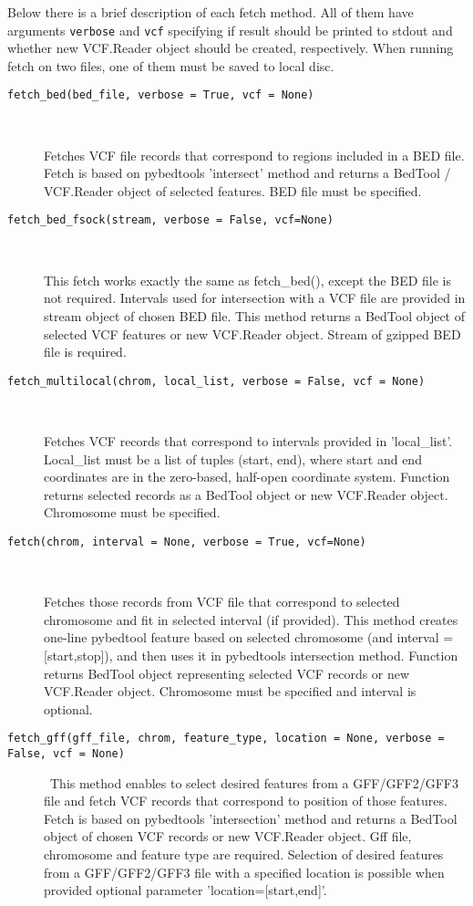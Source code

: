 \noindent Below there is a brief description of each fetch method.
All of them have arguments \verb|verbose| and \verb|vcf| specifying if result should be printed to stdout
and whether new VCF.Reader object should be created, respectively. When running fetch on two files, one of them must be
saved to local disc.

\begin{description}
  \item[\texttt{fetch\_bed(bed\_file, verbose = True, vcf = None)}] \

    Fetches VCF file records that correspond to regions included in a BED file.
    Fetch is based on pybedtools 'intersect' method and returns a BedTool / VCF.Reader object of selected features.
    BED file must be specified.

  \item[\texttt{fetch\_bed\_fsock(stream, verbose = False, vcf=None)}] \

    This fetch works exactly the same as fetch\_bed(), except the BED file is not required.
    Intervals used for intersection with a VCF file are provided in stream object of chosen BED file.
    This method returns a BedTool object of selected VCF features or new VCF.Reader object.
    Stream of gzipped BED file is required.

  \item[\texttt{fetch\_multilocal(chrom, local\_list, verbose = False, vcf = None)}] \

    Fetches VCF records that correspond to intervals provided in 'local\_list'.
    Local\_list must be a list of tuples (start, end), where start and end coordinates are in the
    zero-based, half-open coordinate system. Function returns selected records as a BedTool object
    or new VCF.Reader object. Chromosome must be specified.

  \item[\texttt{fetch(chrom, interval = None, verbose = True, vcf=None)}] \

    Fetches those records from VCF file that correspond to selected chromosome and
    fit in selected interval (if provided).
    This method creates one-line pybedtool feature based on selected chromosome (and interval = [start,stop]),
    and then uses it in pybedtools intersection method.
    Function returns BedTool object representing selected VCF records or new VCF.Reader object.
    Chromosome must be specified and interval is optional.

  \item[\texttt{fetch\_gff(gff\_file, chrom, feature\_type, location = None, verbose = False, vcf = None)}] \
    This method enables to select desired features from a GFF/GFF2/GFF3 file and fetch VCF records
    that correspond to position of those features. Fetch is based on pybedtools 'intersection' method and returns
    a BedTool object of chosen VCF records or new VCF.Reader object.
    Gff file, chromosome and feature type are required.
    Selection of desired features from a GFF/GFF2/GFF3 file with a specified location is possible when
    provided optional parameter 'location=[start,end]'.


\end{description}
